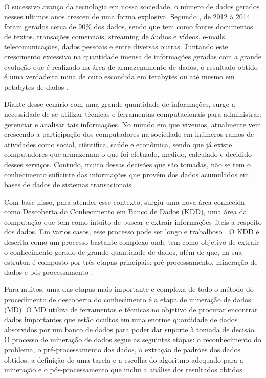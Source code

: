 
\par
O sucessivo avanço da tecnologia em nossa sociedade, o número de dados gerados nesses ultimos anos cresceu de uma forma explosiva. Segundo , de 2012 à 2014 foram gerados cerca de 90\% dos dados, sendo que tem como fontes documentos de textos, transações comerciais, streaming de áudios e vídeos, e-mails, telecomunicações, dados pessoais e entre diversas outras. Juntando este crescimento excessivo na quantidade imensa de informações geradas com a grande evolução que é realizado na área de armazenamento de dados, o resultado obtido é uma verdadeira mina de ouro escondida em terabytes ou até mesmo em petabytes de dados \cite{Carvalho2014}. 

\par
Diante desse cenário com uma grande quantidade de informações, surge a necessidade de se utilizar técnicas e ferramentas computacionais para administrar, gerenciar e analisar tais informações. No mundo em que vivemos, atualmente vem crescendo a participação dos computadores na sociedade em inúmeros ramos de atividades como social, ciêntifica, saúde e econômica, sendo que já existe computadores que armazenam o que foi efetuado, medido, calculado e decidido desses serviços. Contudo, muito dessas decisões que são tomadas, não se tem o conhecimento suficinte das informações que provém dos dados acumulados em bases de dados de sistemas transacionais \cite{Rabelo2007}.

\par
Com base nisso, para atender esse contexto, surgiu uma nova área conhecida como Descoberta do Conhecimento em Banco de Dados (KDD), uma área da computação que tem como intuito de buscar e extrair informações úteis a respeito dos dados. Em varios casos, esse processo pode ser longo e trabalhoso \cite{Stulp2014}. O KDD é descrita como um processo bastante complexo onde tem como objetivo de extrair o conhecimento gerado de grande quantidade de dados, além de que, na sua estrutua é composto por três etapas principais: pré-processamento, mineração de dados e pós-processamento \cite{Rabelo2007}.

\par
Para muitos, uma das etapas mais importante e complexa de todo o método do procedimento de descoberta do conhecimento é a etapa de mineração de dados (MD). O MD utiliza de ferramentas e técnicas no objetivo de procurar encontrar dados importantes que estão ocultos em uma enorme quantidade de dados absorvidos por um banco de dados para poder dar suporte à tomada de decisão. O processo de mineração de dados segue as seguintes etapas: o reconhecimento do problema, o pré-processamento dos dados, a extração de padrões dos dados obtidos, a definição de uma tarefa e a escolha do algoritmo adequado para a mineração e o pós-processamento que inclui a análise dos resultados obtidos \cite{Stulp2014}. 

